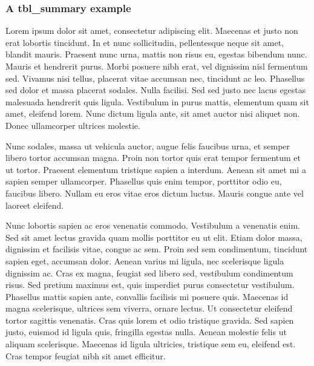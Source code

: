 \documentclass[
]{article}
\begin{document}
\newpage

\hypertarget{a-tbl_summary-example}{%
\subsubsection{A tbl\_summary example}\label{a-tbl_summary-example}}

Lorem ipsum dolor sit amet, consectetur adipiscing elit. Maecenas et
justo non erat lobortis tincidunt. In et nunc sollicitudin, pellentesque
neque sit amet, blandit mauris. Praesent nunc urna, mattis non risus eu,
egestas bibendum nunc. Mauris et hendrerit purus. Morbi posuere nibh
erat, vel dignissim nisl fermentum sed. Vivamus nisi tellus, placerat
vitae accumsan nec, tincidunt ac leo. Phasellus sed dolor et massa
placerat sodales. Nulla facilisi. Sed sed justo nec lacus egestas
malesuada hendrerit quis ligula. Vestibulum in purus mattis, elementum
quam sit amet, eleifend lorem. Nunc dictum ligula ante, sit amet auctor
nisi aliquet non. Donec ullamcorper ultrices molestie.

Nunc sodales, massa ut vehicula auctor, augue felis faucibus urna, et
semper libero tortor accumsan magna. Proin non tortor quis erat tempor
fermentum et ut tortor. Praesent elementum tristique sapien a interdum.
Aenean sit amet mi a sapien semper ullamcorper. Phasellus quis enim
tempor, porttitor odio eu, faucibus libero. Nullam eu eros vitae eros
dictum luctus. Mauris congue ante vel laoreet eleifend.

Nunc lobortis sapien ac eros venenatis commodo. Vestibulum a venenatis
enim. Sed sit amet lectus gravida quam mollis porttitor eu ut elit.
Etiam dolor massa, dignissim et facilisis vitae, congue ac sem. Proin
sed sem condimentum, tincidunt sapien eget, accumsan dolor. Aenean
varius mi ligula, nec scelerisque ligula dignissim ac. Cras ex magna,
feugiat sed libero sed, vestibulum condimentum risus. Sed pretium
maximus est, quis imperdiet purus consectetur vestibulum. Phasellus
mattis sapien ante, convallis facilisis mi posuere quis. Maecenas id
magna scelerisque, ultrices sem viverra, ornare lectus. Ut consectetur
eleifend tortor sagittis venenatis. Cras quis lorem et odio tristique
gravida. Sed sapien justo, euismod id ligula quis, fringilla egestas
nulla. Aenean molestie felis ut aliquam scelerisque. Maecenas id ligula
ultricies, tristique sem eu, eleifend est. Cras tempor feugiat nibh sit
amet efficitur.

 
  \providecommand{\huxb}[2]{\arrayrulecolor[RGB]{#1}\global\arrayrulewidth=#2pt}
  \providecommand{\huxvb}[2]{\color[RGB]{#1}\vrule width #2pt}
  \providecommand{\huxtpad}[1]{\rule{0pt}{#1}}
  \providecommand{\huxbpad}[1]{\rule[-#1]{0pt}{#1}}
\end{document}
